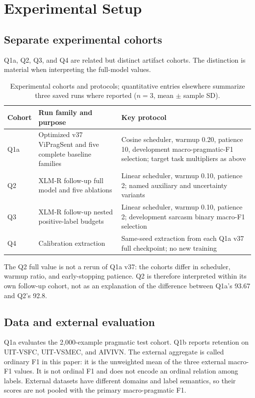 \section{Experimental Setup}

\subsection{Separate experimental cohorts}
Q1a, Q2, Q3, and Q4 are related but distinct artifact cohorts. The distinction is material when interpreting the full-model values.

\begin{table}[t]
\centering
\small
\setlength{\tabcolsep}{3pt}
\begin{tabularx}{\columnwidth}{>{\raggedright\arraybackslash}X >{\raggedright\arraybackslash}X >{\raggedright\arraybackslash}X}
\hline
Cohort & Run family and purpose & Key protocol \\
\hline
Q1a & Optimized v37 ViPragSent and five complete baseline families & Cosine scheduler, warmup 0.20, patience 10, development macro-pragmatic-F1 selection; target task multipliers as above \\
Q2 & XLM-R follow-up full model and five ablations & Linear scheduler, warmup 0.10, patience 2; named auxiliary and uncertainty variants \\
Q3 & XLM-R follow-up nested positive-label budgets & Linear scheduler, warmup 0.10, patience 2; development sarcasm binary macro-F1 selection \\
Q4 & Calibration extraction & Same-seed extraction from each Q1a v37 full checkpoint; no new training \\
\hline
\end{tabularx}
\caption*{Experimental cohorts and protocols; quantitative entries elsewhere summarize three saved runs where reported ($n=3$, mean $\pm$ sample SD).}
\end{table}

The Q2 full value is not a rerun of Q1a v37: the cohorts differ in scheduler, warmup ratio, and early-stopping patience. Q2 is therefore interpreted within its own follow-up cohort, not as an explanation of the difference between Q1a's 93.67 and Q2's 92.8.

\subsection{Data and external evaluation}
Q1a evaluates the 2,000-example pragmatic test cohort. Q1b reports retention on UIT-VSFC, UIT-VSMEC, and AIVIVN. The external aggregate is called ordinary F1 in this paper: it is the unweighted mean of the three external macro-F1 values. It is not ordinal F1 and does not encode an ordinal relation among labels. External datasets have different domains and label semantics, so their scores are not pooled with the primary macro-pragmatic F1.

